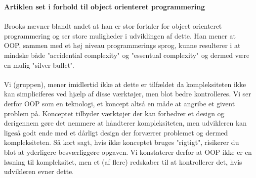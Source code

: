 \documentclass[12pt]{article}
\begin{document}
\noindent\textbf{Artiklen set i forhold til object orienteret programmering}\\\\
Brooks nævner blandt andet at han er stor fortaler for object orienteret programmering og ser store muligheder i udviklingen af dette. Han mener at OOP, sammen med et høj niveau programmerings sprog, kunne resulterer i at mindske både "accidential complexity" og "essentual complexity" og dermed være en mulig "silver bullet".\\\\
Vi (gruppen), mener imidlertid ikke at dette er tilfældet da kompleksiteten ikke kan simpliciferes ved hjælp af disse værktøjer, men blot bedre kontrolleres. Vi ser derfor OOP som en teknologi, et koncept altså en måde at angribe et givent problem på. Konceptet tilbyder værktøjer der kan forbedrer et design og derigennem gøre det nemmere at håndterer kompleksiteten, men udvikleren kan ligeså godt ende med et dårligt design der forværrer problemet og dermed kompleksiteten. Så kort sagt, hvis ikke konceptet bruges "rigtigt", risikerer du blot at yderligere besværliggøre opgaven. Vi konstaterer derfor at OOP ikke er en løsning til kompleksitet, men et (af flere) redskaber til at kontrollerer det, hvis udvikleren evner dette.
\pagebreak
\end{document}

